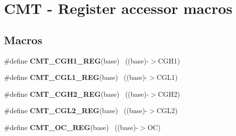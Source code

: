 \hypertarget{group___c_m_t___register___accessor___macros}{}\section{C\+M\+T -\/ Register accessor macros}
\label{group___c_m_t___register___accessor___macros}
\subsection*{Macros}
\begin{DoxyCompactItemize}
\item 
\hypertarget{group___c_m_t___register___accessor___macros_ga1f00c7e08c77c8d2388cc2f0f819d187}{}\#define {\bfseries C\+M\+T\+\_\+\+C\+G\+H1\+\_\+\+R\+E\+G}(base)                                          ~((base)-\/$>$C\+G\+H1)\label{group___c_m_t___register___accessor___macros_ga1f00c7e08c77c8d2388cc2f0f819d187}

\item 
\hypertarget{group___c_m_t___register___accessor___macros_ga771dd48290399c3c4f3b104299e28f66}{}\#define {\bfseries C\+M\+T\+\_\+\+C\+G\+L1\+\_\+\+R\+E\+G}(base)                                          ~((base)-\/$>$C\+G\+L1)\label{group___c_m_t___register___accessor___macros_ga771dd48290399c3c4f3b104299e28f66}

\item 
\hypertarget{group___c_m_t___register___accessor___macros_ga8aeb87a39cf6d86e317a6ddb8340e8fa}{}\#define {\bfseries C\+M\+T\+\_\+\+C\+G\+H2\+\_\+\+R\+E\+G}(base)                                          ~((base)-\/$>$C\+G\+H2)\label{group___c_m_t___register___accessor___macros_ga8aeb87a39cf6d86e317a6ddb8340e8fa}

\item 
\hypertarget{group___c_m_t___register___accessor___macros_gac1baf38413e70d4e3077963d08d67c1a}{}\#define {\bfseries C\+M\+T\+\_\+\+C\+G\+L2\+\_\+\+R\+E\+G}(base)                                          ~((base)-\/$>$C\+G\+L2)\label{group___c_m_t___register___accessor___macros_gac1baf38413e70d4e3077963d08d67c1a}

\item 
\hypertarget{group___c_m_t___register___accessor___macros_ga2b29abafd53b2d21c63ac04ca73c8ab3}{}\#define {\bfseries C\+M\+T\+\_\+\+O\+C\+\_\+\+R\+E\+G}(base)                                              ~((base)-\/$>$O\+C)\label{group___c_m_t___register___accessor___macros_ga2b29abafd53b2d21c63ac04ca73c8ab3}


\end{DoxyCompactItemize}
